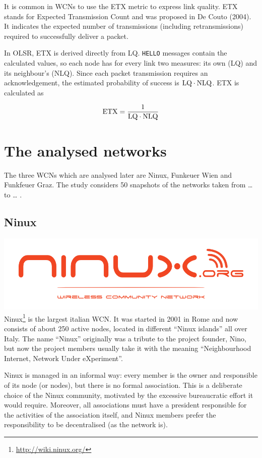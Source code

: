 \documentclass[oneside,openany]{memoir}
\begin{document}
It is common in WCNs to use the ETX metric to express link quality. ETX
stands for Expected Transmission Count and was proposed in De Couto
(2004). It indicates the expected number of transmissions (including
retransmissions) required to successfully deliver a packet.

In OLSR, ETX is derived directly from LQ. \texttt{HELLO} messages
contain the calculated values, so each node has for every link two
measures: its own (LQ) and its neighbour's (NLQ). Since each packet
transmission requires an acknowledgement, the estimated probability of
success is $\mathrm{LQ} \cdot \mathrm{NLQ}$. ETX is calculated as

\begin{equation}
\mathrm{ETX} = \frac{1}{\mathrm{LQ} \cdot \mathrm{NLQ}}
\end{equation}

\chapter{The analysed networks}\label{the-analysed-networks}

The three WCNs which are analysed later are Ninux, Funkeuer Wien and
Funkfeuer Graz. The study considers 50 snapshots of the networks taken
from \ldots{} to \ldots{} .

\section{Ninux}\label{ninux}

\includegraphics{images/ninux_logo.png} Ninux\footnote{\url{http://wiki.ninux.org/}}
is the largest italian WCN. It was started in 2001 in Rome and now
consists of about 250 active nodes, located in different ``Ninux
islands'' all over Italy. The name ``Ninux'' originally was a tribute to
the project founder, Nino, but now the project members usually take it
with the meaning ``Neighbourhood Internet, Network Under eXperiment''.

Ninux is managed in an informal way: every member is the owner and
responsible of its node (or nodes), but there is no formal association.
This is a deliberate choice of the Ninux community, motivated by the
excessive bureaucratic effort it would require. Moreover, all
associations must have a president responsible for the activities of the
association itself, and Ninux members prefer the responsibility to be
decentralised (as the network is).
\end{document}

